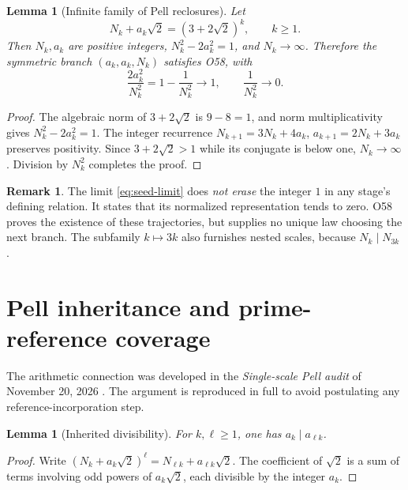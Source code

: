 \documentclass[11pt,a4paper]{article}
\theoremstyle{mine}
\newtheorem{lemma}[theorem]{Lemma}
\theoremstyle{definition}
\newtheorem{remark}[theorem]{Remark}
\begin{document}
\begin{lemma}[Infinite family of Pell reclosures]\label{le:pell}
Let
\begin{equation}\label{eq:pell}
N_k+a_k\sqrt2=(3+2\sqrt2)^k,\qquad k\ge1.
\end{equation}
Then $N_k,a_k$ are positive integers, $N_k^2-2a_k^2=1$, and $N_k\to\infty$. Therefore the symmetric branch $(a_k,a_k,N_k)$ satisfies O58, with
\begin{equation}\label{eq:seed-limit}
\frac{2a_k^2}{N_k^2}=1-\frac1{N_k^2}\longrightarrow1,
\qquad \frac1{N_k^2}\longrightarrow0.
\end{equation}
\end{lemma}
\begin{proof}
The algebraic norm of $3+2\sqrt2$ is $9-8=1$, and norm multiplicativity gives $N_k^2-2a_k^2=1$. The integer recurrence
$N_{k+1}=3N_k+4a_k$, $a_{k+1}=2N_k+3a_k$ preserves positivity. Since $3+2\sqrt2>1$ while its conjugate is below one, $N_k\to\infty$. Division by $N_k^2$ completes the proof.
\end{proof}

\begin{remark}
The limit \eqref{eq:seed-limit} does \emph{not erase} the integer $1$ in any stage's defining relation. It states that its normalized representation tends to zero. O58 proves the existence of these trajectories, but supplies no unique law choosing the next branch. The subfamily $k\mapsto3k$ also furnishes nested scales, because $N_k\mid N_{3k}$ \cite{O58}.
\end{remark}

\section{Pell inheritance and prime-reference coverage}

The arithmetic connection was developed in the \emph{Single-scale Pell audit} of November 20, 2026 \cite{PellAudit}. The argument is reproduced in full to avoid postulating any reference-incorporation step.

\begin{lemma}[Inherited divisibility]\label{le:div}
For $k,\ell\ge1$, one has $a_k\mid a_{\ell k}$.
\end{lemma}
\begin{proof}
Write $(N_k+a_k\sqrt2)^\ell=N_{\ell k}+a_{\ell k}\sqrt2$. The coefficient of $\sqrt2$ is a sum of terms involving odd powers of $a_k\sqrt2$, each divisible by the integer $a_k$.
\end{proof}
\end{document}
